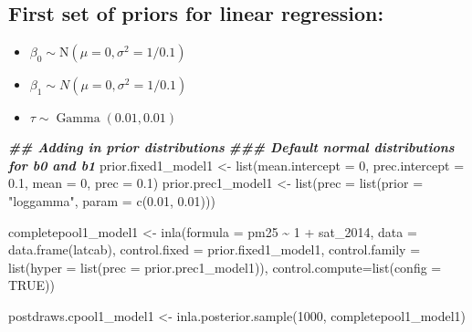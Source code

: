 \documentclass[
]{article}
\newenvironment{Shaded}{\begin{snugshade}}{\end{snugshade}}
\newcommand{\AttributeTok}[1]{\textcolor[rgb]{0.77,0.63,0.00}{#1}}
\newcommand{\ConstantTok}[1]{\textcolor[rgb]{0.00,0.00,0.00}{#1}}
\newcommand{\DecValTok}[1]{\textcolor[rgb]{0.00,0.00,0.81}{#1}}
\newcommand{\DocumentationTok}[1]{\textcolor[rgb]{0.56,0.35,0.01}{\textbf{\textit{#1}}}}
\newcommand{\FloatTok}[1]{\textcolor[rgb]{0.00,0.00,0.81}{#1}}
\newcommand{\FunctionTok}[1]{\textcolor[rgb]{0.00,0.00,0.00}{#1}}
\newcommand{\NormalTok}[1]{#1}
\newcommand{\OtherTok}[1]{\textcolor[rgb]{0.56,0.35,0.01}{#1}}
\newcommand{\SpecialCharTok}[1]{\textcolor[rgb]{0.00,0.00,0.00}{#1}}
\newcommand{\StringTok}[1]{\textcolor[rgb]{0.31,0.60,0.02}{#1}}
\providecommand{\tightlist}{%
  \setlength{\itemsep}{0pt}\setlength{\parskip}{0pt}}
\begin{document}
\hypertarget{first-set-of-priors-for-linear-regression}{%
\subsection{First set of priors for linear
regression:}\label{first-set-of-priors-for-linear-regression}}

\begin{itemize}
\tightlist
\item
  \(\beta_0 \sim \mathrm{N}\left(\mu=0, \sigma^2=1 / 0.1\right)\)
\item
  \(\beta_1 \sim N\left(\mu=0, \sigma^2=1 / 0.1\right)\)
\item
  \(\tau \sim \operatorname{Gamma}(0.01,0.01)\)
\end{itemize}

\begin{Shaded}
\begin{Highlighting}[]
\DocumentationTok{\#\# Adding in prior distributions}
\DocumentationTok{\#\#\# Default normal distributions for b0 and b1}
\NormalTok{prior.fixed1\_model1 }\OtherTok{\textless{}{-}} \FunctionTok{list}\NormalTok{(}\AttributeTok{mean.intercept =} \DecValTok{0}\NormalTok{, }\AttributeTok{prec.intercept =} \FloatTok{0.1}\NormalTok{,}
                    \AttributeTok{mean =} \DecValTok{0}\NormalTok{, }\AttributeTok{prec =} \FloatTok{0.1}\NormalTok{)}
\NormalTok{prior.prec1\_model1 }\OtherTok{\textless{}{-}} \FunctionTok{list}\NormalTok{(}\AttributeTok{prec =} \FunctionTok{list}\NormalTok{(}\AttributeTok{prior =} \StringTok{"loggamma"}\NormalTok{, }
                               \AttributeTok{param =} \FunctionTok{c}\NormalTok{(}\FloatTok{0.01}\NormalTok{, }\FloatTok{0.01}\NormalTok{)))}

\NormalTok{completepool1\_model1 }\OtherTok{\textless{}{-}} \FunctionTok{inla}\NormalTok{(}\AttributeTok{formula =}\NormalTok{ pm25 }\SpecialCharTok{\textasciitilde{}} \DecValTok{1} \SpecialCharTok{+}\NormalTok{ sat\_2014, }
                     \AttributeTok{data =} \FunctionTok{data.frame}\NormalTok{(latcab), }
                     \AttributeTok{control.fixed =}\NormalTok{ prior.fixed1\_model1, }
                     \AttributeTok{control.family =} \FunctionTok{list}\NormalTok{(}\AttributeTok{hyper =} \FunctionTok{list}\NormalTok{(}\AttributeTok{prec =}\NormalTok{ prior.prec1\_model1)),}
                     \AttributeTok{control.compute=}\FunctionTok{list}\NormalTok{(}\AttributeTok{config =} \ConstantTok{TRUE}\NormalTok{))}

\NormalTok{postdraws.cpool1\_model1 }\OtherTok{\textless{}{-}} \FunctionTok{inla.posterior.sample}\NormalTok{(}\DecValTok{1000}\NormalTok{, completepool1\_model1)}


\end{Highlighting}
\end{Shaded}
\end{document}
